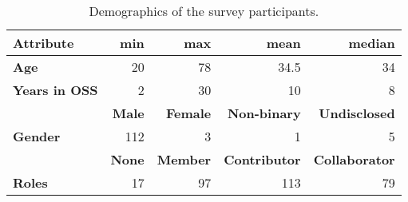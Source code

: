 \begin{table}
\centering
        \caption{Demographics of the survey participants.}
    \begin{tabular}{l rrrr}
    \toprule
    \textbf{Attribute} & \textbf{min} & \textbf{max} & \textbf{mean} & \textbf{median} \\
    \midrule
    \textbf{Age} & 20 & 78 & 34.5 & 34\\
    \textbf{Years in OSS} & 2 & 30 & 10 & 8 \\
    \midrule
    & \textbf{Male} & \textbf{Female} & \textbf{ Non-binary} & \textbf{Undisclosed} \\
    \midrule
    \textbf{Gender} & 112 & 3 & 1 & 5\\
    \midrule
    & \textbf{None} & \textbf{Member} & \textbf{Contributor} & \textbf{Collaborator} \\
    \midrule
    \textbf{Roles} & 17 & 97 & 113 & 79\\
    \bottomrule
    \end{tabular}

    \label{tab:demographics}
\end{table}